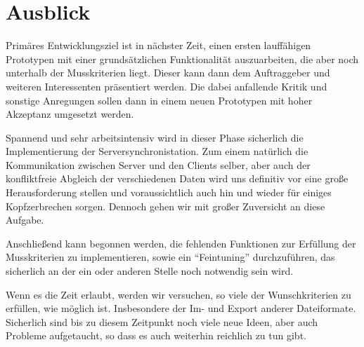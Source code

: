 \part{Ausblick}

Prim\"ares Entwicklungsziel ist in n\"achster Zeit, einen ersten lauff\"ahigen Prototypen mit einer grunds\"atzlichen
Funktionalit\"at auszuarbeiten, die aber noch unterhalb der Musskriterien liegt. Dieser kann dann dem Auftraggeber und weiteren 
Interessenten pr\"asentiert werden. Die dabei anfallende Kritik und sonstige Anregungen sollen dann in einem neuen Prototypen 
mit hoher Akzeptanz umgesetzt werden.

Spannend und sehr arbeitsintensiv wird in dieser Phase sicherlich die Implementierung der Serversynchronistation. Zum einem
nat\"urlich die Kommunikation zwischen Server und den Clients selber, aber auch der konfliktfreie Abgleich der verschiedenen
Daten wird uns definitiv vor eine gro{\ss}e Herausforderung stellen und voraussichtlich auch hin und wieder f\"ur einiges
Kopfzerbrechen sorgen. Dennoch gehen wir mit gro{\ss}er Zuversicht an diese Aufgabe.

Anschlie{\ss}end kann begonnen werden, die fehlenden Funktionen zur Erf\"ul\-lung der Musskriterien zu implementieren, sowie ein 
``Feintuning'' durchzuf\"uhren, das sicherlich an der ein oder anderen Stelle noch notwendig sein wird.

Wenn es die Zeit erlaubt, werden wir versuchen, so viele der Wunschkriterien zu erf\"ullen, wie m\"oglich ist. Insbesondere
der Im- und Export anderer Dateiformate. Sicherlich sind bis zu diesem Zeitpunkt noch viele neue Ideen, aber auch
Probleme aufgetaucht, so dass es auch weiterhin reichlich zu tun gibt.

 

